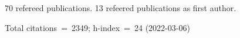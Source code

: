 70 refereed publications. 13 refeered publications as first author.

Total citations~=~2349; h-index~=~24 (2022-03-06)